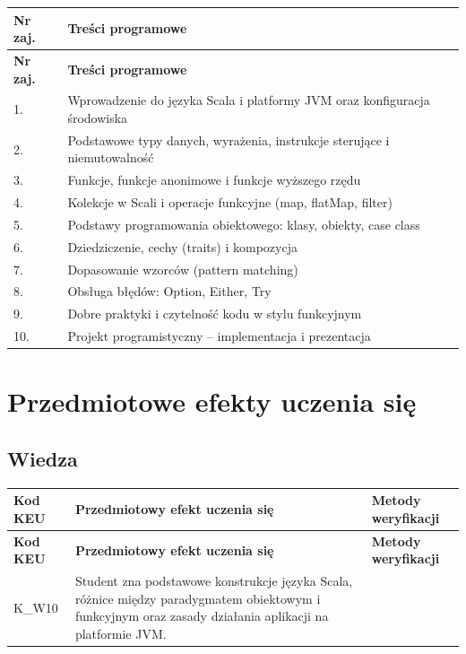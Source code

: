 \documentclass[12pt, a4paper]{article}
\newcommand{\thdrule}{\noalign{\global\setlength{\extrarowheight}{0pt}}}
\newcommand{\thdend}{\noalign{\global\setlength{\extrarowheight}{3pt}}}
\begin{document}
{\scriptsize
\begin{longtable}{m{1.5cm}m{14.5cm}}
\thdrule\toprule
\rowcolor{pjatkRed} {\color{white}\textbf{Nr zaj.}} & {\color{white}\textbf{Treści programowe}} \\
\midrule\thdend
\endfirsthead
\thdrule\toprule
\rowcolor{pjatkRed} {\color{white}\textbf{Nr zaj.}} & {\color{white}\textbf{Treści programowe}} \\
\midrule\thdend
\endhead
  \rowcolor{tableRowLight} 1. & Wprowadzenie do języka Scala i platformy JVM oraz konfiguracja środowiska \\
  \rowcolor{tableRowAlt} 2. & Podstawowe typy danych, wyrażenia, instrukcje sterujące i niemutowalność \\
  \rowcolor{tableRowLight} 3. & Funkcje, funkcje anonimowe i funkcje wyższego rzędu \\
  \rowcolor{tableRowAlt} 4. & Kolekcje w Scali i operacje funkcyjne (map, flatMap, filter) \\
  \rowcolor{tableRowLight} 5. & Podstawy programowania obiektowego: klasy, obiekty, case class \\
  \rowcolor{tableRowAlt} 6. & Dziedziczenie, cechy (traits) i kompozycja \\
  \rowcolor{tableRowLight} 7. & Dopasowanie wzorców (pattern matching) \\
  \rowcolor{tableRowAlt} 8. & Obsługa błędów: Option, Either, Try \\
  \rowcolor{tableRowLight} 9. & Dobre praktyki i czytelność kodu w stylu funkcyjnym \\
  \rowcolor{tableRowAlt} 10. & Projekt programistyczny – implementacja i prezentacja \\
\bottomrule
\end{longtable}}

\section{Przedmiotowe efekty uczenia się}

\subsection*{Wiedza}
{\scriptsize
\begin{longtable}{m{1.6cm}m{9.0cm}m{4.2cm}}
\thdrule\toprule
\rowcolor{pjatkRed} {\color{white}\footnotesize\textbf{\vphantom{Ag}Kod KEU}} & {\color{white}\footnotesize\textbf{\vphantom{Ag}Przedmiotowy efekt uczenia się}} & {\color{white}\footnotesize\textbf{\vphantom{Ag}Metody weryfikacji}} \\
\midrule\thdend
\endfirsthead
\thdrule\toprule
\rowcolor{pjatkRed} {\color{white}\footnotesize\textbf{\vphantom{Ag}Kod KEU}} & {\color{white}\footnotesize\textbf{\vphantom{Ag}Przedmiotowy efekt uczenia się}} & {\color{white}\footnotesize\textbf{\vphantom{Ag}Metody weryfikacji}} \\
\midrule\thdend
\endhead
  \rowcolor{tableRowLight} K\_W10 & Student zna podstawowe konstrukcje języka Scala, różnice między paradygmatem obiektowym i funkcyjnym oraz zasady działania aplikacji na platformie JVM. &  \\
\bottomrule
\end{longtable}}
\end{document}
